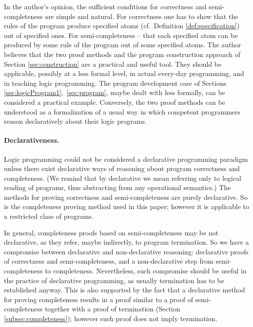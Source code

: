 \documentclass{tlp}
\begin{document}
In the author's opinion,
the sufficient conditions for correctness and semi{-}com\-pleteness
are simple and natural.  
For correctness one has to show that the rules of
the program produce specified atoms (cf.\ Definition \ref{def:specification})
 out of specified ones.
For semi-completeness -- that each specified atom can be produced by some rule of
the program out of some specified atoms.
The author believes
  that the two proof methods
  and the program construction approach of Section \ref{sec:construction}
  are a practical and useful tool.  They should be applicable,
  possibly at a less formal level, in actual every-day programming, 
   and in teaching logic programming.
The program development case of Sections
\ref{sec:logicProgram1},~\ref{sec:program},
maybe dealt with less formally, can be considered a practical example.
Conversely,
the two proof methods can be understood as a formalization of a usual way in
which competent programmers reason declaratively about their logic programs.





\paragraph{Declarativeness.}
Logic programming could not be considered a declarative programming paradigm
unless there exist
declarative ways of reasoning about program correctness
and completeness.
(We remind that by declarative we mean referring only to logical reading of 
programs, thus abstracting from any operational semantics.)
The methods for proving correctness and semi-completeness
are purely declarative.  
So is the completeness proving method used in this paper; however it is 
applicable to a restricted class of programs.



In general, completeness proofs based on semi-completeness
 may be not declarative, as 
they refer, maybe indirectly, to program termination.
So we have a compromise between declarative and non-declarative reasoning:
declarative proofs of correctness and semi-completeness, and a
non-declarative step from semi-completeness to completeness.
Nevertheless, such compromise 
should be useful in the practice of declarative programming,
as usually termination has to be established anyway.
This is also supported by the fact that
a declarative method for proving completeness \cite{Deransart.Maluszynski93}
results in a proof similar to a proof of semi-completeness together with a
proof of termination (Section \ref{subsec:completeness});
however such proof does not imply termination.
\end{document}
